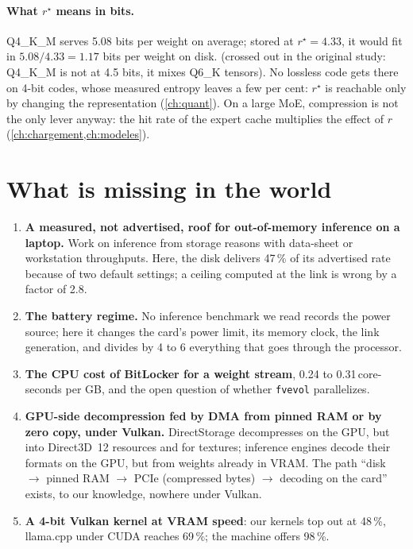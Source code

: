 \paragraph{What $r^\star$ means in bits.} Q4\_K\_M serves 5.08 bits per weight on average; stored at $r^\star = 4.33$, it would fit in $5.08/4.33 = \mathbf{1.17}$ bits per weight on disk.  (crossed out in the original study: Q4\_K\_M is not at 4.5 bits, it mixes Q6\_K tensors). No lossless code gets there on 4-bit codes, whose measured entropy leaves a few per cent: $r^\star$ is reachable only by changing the representation (\cref{ch:quant}). On a large MoE, compression is not the only lever anyway: the hit rate of the expert cache multiplies the effect of $r$ (\cref{ch:chargement,ch:modeles}).

\section{What is missing in the world}

\begin{enumerate}
\item \textbf{A measured, not advertised, roof for out-of-memory inference on a laptop.} Work on inference from storage reasons with data-sheet or workstation throughputs. Here, the disk delivers 47\,\% of its advertised rate because of two default settings; a ceiling computed at the link is wrong by a factor of 2.8.
\item \textbf{The battery regime.} No inference benchmark we read records the power source; here it changes the card's power limit, its memory clock, the link generation, and divides by 4 to 6 everything that goes through the processor.
\item \textbf{The CPU cost of BitLocker for a weight stream}, 0.24 to 0.31\,core-seconds per GB, and the open question of whether \texttt{fvevol} parallelizes.
\item \textbf{GPU-side decompression fed by DMA from pinned RAM or by zero copy, under Vulkan.} DirectStorage decompresses on the GPU, but into Direct3D~12 resources and for textures; inference engines decode their formats on the GPU, but from weights already in VRAM. The path \enquote{disk $\to$ pinned RAM $\to$ PCIe (compressed bytes) $\to$ decoding on the card} exists, to our knowledge, nowhere under Vulkan.
\item \textbf{A 4-bit Vulkan kernel at VRAM speed}: our kernels top out at 48\,\%, llama.cpp under CUDA reaches 69\,\%; the machine offers 98\,\%.
\end{enumerate}

